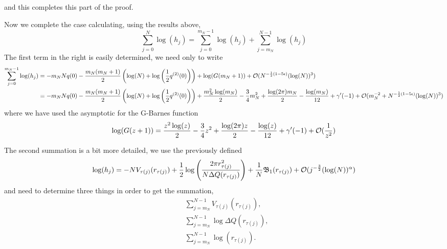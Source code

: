 and this completes this part of the proof.  

Now we complete the case calculating, using the results above,
\begin{equation}
	\sum_{j=0}^{N} \log(h_j) = \sum_{j=0}^{m_N - 1} \log(h_j)  + \sum_{j=m_N}^{N - 1} \log(h_j) 
\end{equation}
The first term in the right is easily determined, we need only to write
\begin{align}
	 \sum_{j=0}^{m_N - 1} \log(h_j) & = -m_N N q(0) - \frac{m_N(m_N + 1)}{2} \left( \log(N) + \log\left( \frac{1}{2} q^{(2)}(0) \right) \right) + \log(G(m_N + 1)) + \mathcal{O}(N^{-\frac{1}{2}(1-5\epsilon)} (\log(N))^3) \\
	 & = -m_N N q(0) - \frac{m_N(m_N + 1)}{2} \left( \log(N) + \log\left( \frac{1}{2} q^{(2)}(0) \right)  \right) +  \frac{m_N^2 \log(m_N)}{2} - \frac{3}{4} m_N^2 + \frac{\log(2\pi) m_N}{2} - \frac{\log(m_N)}{12} + \gamma'(-1)+ \mathcal{O}(m_N^{-2}+ N^{-\frac{1}{2}(1-5\epsilon)} (\log(N))^3)
\end{align}
where we have used the asymptotic for the G-Barnes function
\begin{equation}
	\log(G(z+1)) = \frac{z^2 \log(z)}{2} - \frac{3}{4} z^2 + \frac{\log(2\pi) z}{2} - \frac{\log(z)}{12} + \gamma'(-1) + \mathcal{O}(\frac{1}{z^2})
\end{equation}

The second summation is a bit more detailed, we use the previously defined
\begin{equation}
	\log(h_j) = -N V_{\tau(j)} (r_{\tau(j)}) + \frac{1}{2} \log{\left( \frac{2\pi r^2_{\tau(j)}}{N \Delta Q(r_{\tau(j)})} \right)} + \frac{1}{N} \mathfrak{B}_1(r_{\tau(j)}) + \mathcal{O}(j^{-\frac{3}{2}} (\log(N))^\alpha)
\end{equation}
and need to determine three things in order to get the summation,
\begin{align}
	& \sum_{j=m_N}^{N-1} V_{\tau(j)}(r_{\tau(j)}), \\
	& \sum_{j=m_N}^{N-1} \log \Delta Q(r_{\tau(j)}), \\
	&  \sum_{j=m_N}^{N-1} \log(r_{\tau(j)}).
\end{align}

